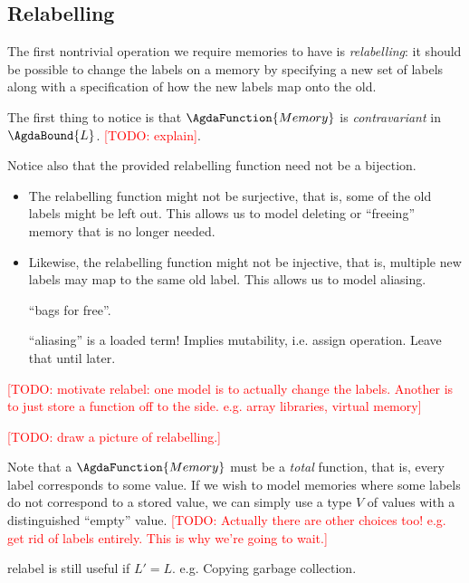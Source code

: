 \documentclass{jfp1}
\newcommand{\todo}[1]{\textcolor{red}{[TODO: #1]}}
\newcommand{\todo}[1]{}
\begin{document}
\subsection{Relabelling}
\label{sec:relabelling}

The first nontrivial operation we require memories to have is
\emph{relabelling}: it should be possible to change the labels on a
memory by specifying a new set of labels along with a specification of
how the new labels map onto the old.


The first thing to notice is that $\AgdaFunction{Memory}$ is
\emph{contravariant} in $\AgdaBound{L}$. \todo{explain}.

Notice also that the provided relabelling function need not be a
bijection.

\begin{itemize}
\item The relabelling function might not be surjective, that is, some
  of the old labels might be left out. This allows us to model
  deleting or ``freeing'' memory that is no longer needed.
\item Likewise, the relabelling function might not be injective, that
  is, multiple new labels may map to the same old label.  This allows
  us to model aliasing.

  ``bags for free''.

  ``aliasing'' is a loaded term!  Implies mutability, i.e. assign
  operation.  Leave that until later.
\end{itemize}

\todo{motivate relabel: one model is to actually change the labels.
  Another is to just store a function off to the side.  e.g. array
  libraries, virtual memory}

\todo{draw a picture of relabelling.}

Note that a $\AgdaFunction{Memory}$ must be a \emph{total} function,
that is, every label corresponds to some value.  If we wish to model
memories where some labels do not correspond to a stored value, we can
simply use a type $V$ of values with a distinguished ``empty'' value.
\todo{Actually there are other choices too!  e.g. get rid of labels
  entirely.  This is why we're going to wait.}

\begin{commentary}
  relabel is still useful if $L' = L$.  e.g. Copying garbage collection.
\end{commentary}
\end{document}
